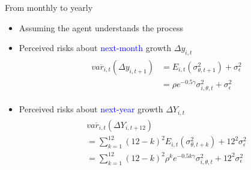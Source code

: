 \documentclass{beamer}
\begin{document}
\begin{frame}{From monthly to yearly }
	\begin{itemize}
		\item Assuming the agent understands the process 
	\end{itemize}
	\begin{itemize}
		\item Perceived risks about \textcolor{blue}{next-month} growth $\Delta y_{i,t}$
		\begin{eqnarray*}
			\begin{split}
				& \overline {var_{i,t}}(\Delta y_{i,t+1}) & = E_{i,t}( {\sigma^2_{\theta,t+1}}) + \sigma^2_{\epsilon} \\
				& & = \rho e^{-0.5\gamma} \sigma^2_{i,\theta,t}  + \sigma^2_{\epsilon} 
			\end{split}
		\end{eqnarray*}
		
		\item Perceived risks about \textcolor{blue}{next-year} growth $\Delta Y_{i,t}$
		\begin{eqnarray*}
			\begin{split}
				& \overline {var_{i,t}}(\Delta Y_{i,t+12}) \\
				& = \sum^{12}_{k=1} (12-k)^2 E_{i,t}( {\sigma^2_{\theta,t+k}}) + 12^2 \sigma^2_{\epsilon} \\ 
				& = \sum^{12}_{k=1} (12-k)^2 \rho^k e^{-0.5k\gamma} \sigma^2_{i,\theta,t}+ 12^2 \sigma^2_{\epsilon}  	 
			\end{split}
		\end{eqnarray*}
	\end{itemize}
\end{frame}

\end{document}
